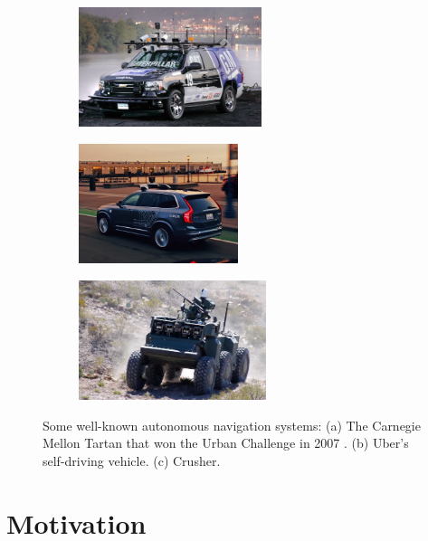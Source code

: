 \documentclass[../thesis.tex]{subfiles}
\begin{document}
\begin{figure}
    \centering
    \begin{subfigure}[b]{0.32\linewidth}
        \includegraphics[height=3.5cm]{./Introduction/fig/urban_challenge.jpg}
    \end{subfigure}
    \begin{subfigure}[b]{0.32\linewidth}
        \includegraphics[height=3.5cm]{./Introduction/fig/uber.jpg}
    \end{subfigure}
    \begin{subfigure}[b]{0.32\linewidth}
        \includegraphics[height=3.5cm]{./Introduction/fig/crusher.jpg}
    \end{subfigure}
    \caption{Some well-known autonomous navigation systems: (a) The Carnegie Mellon Tartan that won the Urban Challenge in 2007 \cite{boss}. (b) Uber's self-driving vehicle. (c) Crusher. \cite{stentz2007crusher}}
    \label{fig:uber_rock}
\end{figure}

\section{Motivation}

\end{document}
